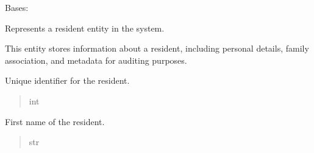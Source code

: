 \documentclass[letterpaper,10pt,english]{sphinxmanual}
\begin{document}
\begin{fulllineitems}
\label{\detokenize{app.mysql:app.mysql.resident.Resident}}
\pysigstartsignatures
\pysiglinewithargsret
{}
{}
{}
\pysigstopsignatures
\sphinxAtStartPar
Bases: 

\sphinxAtStartPar
Represents a resident entity in the system.

\sphinxAtStartPar
This entity stores information about a resident, including personal
details, family association, and metadata for auditing purposes.

\begin{fulllineitems}
\label{\detokenize{app.mysql:app.mysql.resident.Resident.idResident}}
\pysigstartsignatures
\pysigline
{}
\pysigstopsignatures
\sphinxAtStartPar
Unique identifier for the resident.
\begin{quote}\begin{description}
\sphinxAtStartPar
int

\end{description}\end{quote}

\end{fulllineitems}


\begin{fulllineitems}
\label{\detokenize{app.mysql:app.mysql.resident.Resident.name}}
\pysigstartsignatures
\pysigline
{}
\pysigstopsignatures
\sphinxAtStartPar
First name of the resident.
\begin{quote}\begin{description}
\sphinxAtStartPar
str

\end{description}\end{quote}

\end{fulllineitems}



\end{fulllineitems}
\end{document}
